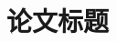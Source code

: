 \documentclass[12pt, a4paper]{ctexart} %
\title{\vspace{-3cm} \heiti \zihao{5} \LARGE 论文标题}%
\date{}
\numberwithin{equation}{section}%
\numberwithin{figure}{section}%
\begin{document}
\begin{spacing}{1.3541667}%

\end{spacing}
\end{document}
